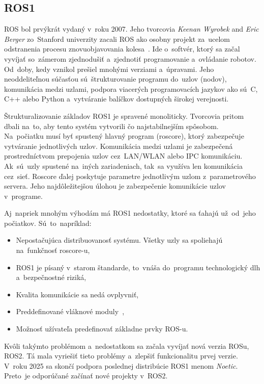 \subsection{ROS1}
\label{subsec:ros1}

ROS bol prvýkrát vydaný v~roku 2007. Jeho tvorcovia \textit{Keenan Wyrobek} and \textit{Eric Berger} zo~Stanford
univerzity zacali ROS ako osobny projekt za~ucelom odstranenia procesu znovuobjavovania kolesa~\cite{rosHistory}.
Ide o~softvér, ktorý sa začal vyvíjať so~zámerom zjednodušiť a~zjednotiť programovanie a~ovládanie robotov.
Od~doby, kedy vznikol prešiel mnohými verziami a~úpravami. Jeho neoddeliteľnou súčasťou sú~štrukturovanie programu
do~uzlov (nodov), komunikácia medzi uzlami, podpora viacerých programovacích jazykov ako sú~C, C++ alebo Python
a~vytváranie balíčkov dostupných širokej verejnosti.

Štrukturalizovanie základov ROS1 je spravené monoliticky. Tvorcovia pritom dbali na~to, aby tento
systém vytvorili čo najstabilnejším spôsobom. Na~počiatku musí byť spustený hlavný program (roscore),
ktorý zabezpečuje vytváranie jednotlivých uzlov. Komunikácia medzi uzlami je zabezpečená prostredníctvom
prepojenia uzlov cez~LAN/WLAN alebo IPC komunikáciu. Ak~sú~uzly spustené na~iných zariadeniach,
tak~sa využíva len komunikácia cez~sieť. Roscore ďalej poskytuje parametre jednotlivým uzlom
z~parametrového servera. Jeho najdôležitejšou úlohou je zabezpečenie komunikácie uzlov v~programe.

\clearpage

Aj~napriek mnohým výhodám má ROS1 nedostatky, ktoré sa ťahajú už~od~jeho počiatkov. Sú~to~napríklad:

\begin{itemize}
	\item Nepostačujúca distribuovanosť systému. Všetky uzly sa spoliehajú na~funkčnosť roscore-u,
	\item ROS1 je písaný v~starom štandarde, to~vnáša do~programu technologický dlh a~bezpečnostné riziká,
	\item Kvalita komunikácie sa nedá ovplyvniť,
	\item Preddefinované vláknové moduly~\cite{ROS2design},
	\item Možnosť užívateľa predefinovať základne prvky ROS-u.
\end{itemize}

Kvôli takýmto problémom a~nedostatkom sa začala vyvíjať nová verzia ROSu, ROS2. Tá mala vyriešiť tieto problémy a~zlepšiť funkcionalitu
prvej verzie. V~roku 2025 sa skončí podpora poslednej distribúcie ROS1 menom \textit{Noetic}. Preto~je odporúčané začínať nové projekty
v~ROS2.

